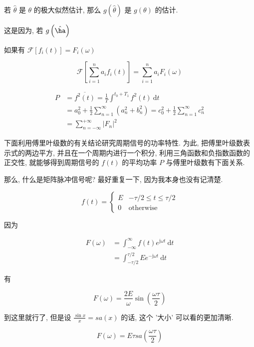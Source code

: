 \documentclass[a4paper, 10pt]{ctexbook} %
\begin{document}
若 $\hat \theta $ 是 $\theta $ 的极大似然估计, 那么 $g\left(\hat \theta \right)$ 是 $g\left(\theta \right)$ 的估计. 

这是因为, 若 $g\left(\hat \ha\right)$


如果有 $\mathscr F \left[  f_{i} \left(t\right) \right]=F_{i} \left( \omega\right)$

$$\mathscr F \left[  \sum_{i=1} ^{n} a_{i} f_{i} \left(t\right) \right] = \sum_{i=1} ^{n} a_{i   } F_{i} \left(\omega\right)  $$



$$ \begin{aligned} P & = \overline{f^{2} \left(t\right)} = \frac{1}{T} \int ^{t_{0} + T _{1} } f^{2} \left(t\right) \ \mathrm{d} t \\ & = a_0^{2} + \frac{1}{2} \sum_{n=1} ^{\infty} \left(a_{n}^{2} + b_{n}^{2}\right)  = c_{0} ^{2} + \frac{1}{2} \sum_{n=1} ^{\infty} c_{n} ^{2} \\ & = \sum_{n= -\infty} ^{+\infty} \left|  F_{n}  \right|  ^{2} \end{aligned} $$


下面利用傅里叶级数的有关结论研究周期信号的功率特性. 为此, 把傅里叶级数表示式的两边平方, 并且在一个周期内进行一个积分, 利用三角函数和负指数函数的正交性, 就能够得到周期信号的 $f\left(t\right) $ 的平均功率 $P$ 与傅里叶级数有下面关系. 


那么, 什么是矩阵脉冲信号呢? 最好重复一下, 因为我本身也没有记清楚. 

$$f\left(t\right) = \begin{cases} E & - \tau /2 \le t \le \tau /2 \\ 0 & \text{otherwise} \end{cases} $$

因为 

$$ \begin{aligned} F\left(\omega\right)  & = \int ^{\infty} _{-\infty} f\left(t\right) e ^{\mathrm{j} \omega   t  }\ \mathrm{d} t \\ & = \int ^{\tau  /2 } _{ - \tau /2   } E e ^{-\mathrm{j} \omega t} \ \mathrm{d} t  \end{aligned} $$


有 

$$F \left(\omega\right) = \frac{2E}{\omega} \sin  \left( \frac{\omega\tau}{2}\right)$$

到这里就行了, 但是设 $\displaystyle  \frac{\sin  x}{ x}  = sa \left(x\right)$ 的话, 这个 '大小' 可以看的更加清晰. 

$$F \left(\omega\right) =  E \tau sa \left( \frac{ \omega \tau}{ 2}\right)$$
\end{document}
